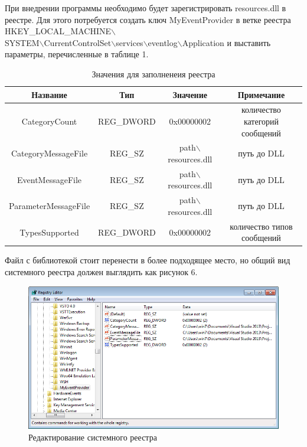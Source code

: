 \documentclass[a4paper, 12pt]{report}		%
\begin{document}
При внедрении программы необходимо будет зарегистрировать resources.dll в реестре. Для этого потребуется создать ключ MyEventProvider в ветке реестра HKEY\_LOCAL\_MACHINE$\backslash$\\
SYSTEM$\backslash$CurrentControlSet$\backslash$services$\backslash$eventlog$\backslash$Application и выставить параметры, перечисленные в таблице 1.

\begin{table}[htb]
\begin{tabular}{|c|c|c|c|}
\hline 
Название & Тип & Значение & Примечание \\ 
\hline 
CategoryCount & REG{\_}DWORD & 0x00000002 & количество категорий сообщений \\ 
\hline 
CategoryMessageFile & REG{\_}SZ & path$\backslash$resources.dll & путь до DLL \\ 
\hline 
EventMessageFile & REG{\_}SZ & path$\backslash$resources.dll & путь до DLL \\ 
\hline 
ParameterMessageFile & REG{\_}SZ & path$\backslash$resources.dll & путь до DLL \\ 
\hline 
TypesSupported & REG{\_}DWORD & 0x00000002 & количество типов сообщений \\ 
\hline 
\end{tabular} 
\caption{Значения для заполненеия реестра}
\end{table}

Файл с библиотекой стоит перенести в более подходящее место, но общий вид системного реестра должен выглядить как рисунок 6.

\begin{figure}[h!]
\centering
\includegraphics[scale=0.8]{res/reg}
\caption{Редактирование системного реестра}
\end{figure}
\end{document}
